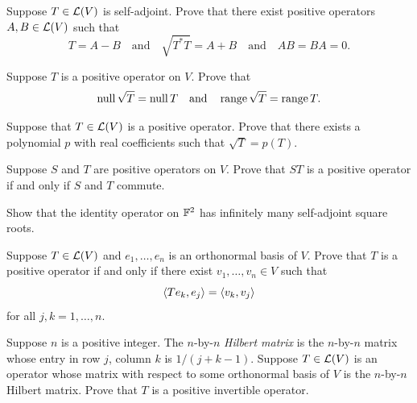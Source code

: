 \begin{exc}
\begin{exercise}
Suppose $T\in\mathcal{L}(V)$ is self-adjoint. Prove that there exist positive operators
$A,B\in\mathcal{L}(V)$ such that
\[ T=A-B \quad\text{and}\quad \sqrt{T^*T}=A+B \quad\text{and}\quad AB=BA=0. \]
\end{exercise}

\begin{exercise}
Suppose $T$ is a positive operator on $V$. Prove that
\[ \operatorname{null}\sqrt{T}=\operatorname{null} T \quad\text{and}\quad \operatorname{range}\sqrt{T}=\operatorname{range} T. \]
\end{exercise}

\begin{exercise}
Suppose that $T\in\mathcal{L}(V)$ is a positive operator. Prove that there exists a
polynomial $p$ with real coefficients such that $\sqrt{T}=p(T)$.
\end{exercise}

\begin{exercise}
Suppose $S$ and $T$ are positive operators on $V$. Prove that $ST$ is a positive
operator if and only if $S$ and $T$ commute.
\end{exercise}

\begin{exercise}
Show that the identity operator on $\mathbb{F}^2$ has infinitely many self-adjoint
square roots.
\end{exercise}

\begin{exercise}
Suppose $T\in\mathcal{L}(V)$ and $e_1,\dots,e_n$ is an orthonormal basis of $V$. Prove
that $T$ is a positive operator if and only if there exist $v_1,\dots,v_n\in V$
such that
\[ \langle Te_k, e_j \rangle=\langle v_k, v_j \rangle \]
for all $j,k=1,\dots,n$.
\end{exercise}

\begin{exercise}
Suppose $n$ is a positive integer. The $n$-by-$n$ \emph{Hilbert matrix} is the
$n$-by-$n$ matrix whose entry in row $j$, column $k$ is $1/(j+k-1)$.
Suppose $T\in\mathcal{L}(V)$ is an operator whose matrix with respect to some
orthonormal basis of $V$ is the $n$-by-$n$ Hilbert matrix. Prove that $T$ is a
positive invertible operator.
\end{exercise}


\end{exc}
